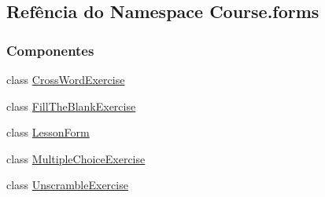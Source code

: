 \hypertarget{namespaceCourse_1_1forms}{}\subsection{Refência do Namespace Course.\+forms}
\label{namespaceCourse_1_1forms}
\subsubsection*{Componentes}
\begin{DoxyCompactItemize}
\item 
class \hyperlink{classCourse_1_1forms_1_1CrossWordExercise}{Cross\+Word\+Exercise}
\item 
class \hyperlink{classCourse_1_1forms_1_1FillTheBlankExercise}{Fill\+The\+Blank\+Exercise}
\item 
class \hyperlink{classCourse_1_1forms_1_1LessonForm}{Lesson\+Form}
\item 
class \hyperlink{classCourse_1_1forms_1_1MultipleChoiceExercise}{Multiple\+Choice\+Exercise}
\item 
class \hyperlink{classCourse_1_1forms_1_1UnscrambleExercise}{Unscramble\+Exercise}
\end{DoxyCompactItemize}
